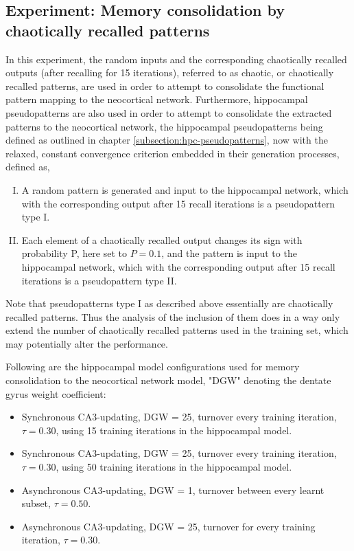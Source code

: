 \subsection{Experiment: Memory consolidation by chaotically recalled patterns}\label{subsect:rand-in-chaotic-out}

In this experiment, the random inputs and the corresponding chaotically recalled outputs (after recalling for 15 iterations), referred to as chaotic, or chaotically recalled patterns, are used in order to attempt to consolidate the functional pattern mapping to the neocortical network. Furthermore, hippocampal pseudopatterns are also used in order to attempt to consolidate the extracted patterns to the neocortical network, the hippocampal pseudopatterns being defined as outlined in chapter \ref{subsection:hpc-pseudopatterns}, now with the relaxed, constant convergence criterion embedded in their generation processes, defined as,

\begin{enumerate}[I.]
    \item A random pattern is generated and input to the hippocampal network, which with the corresponding output after 15 recall iterations is a pseudopattern type I.
    \item Each element of a chaotically recalled output changes its sign with probability P, here set to $P=0.1$, and the pattern is input to the hippocampal network, which with the corresponding output after 15 recall iterations is a pseudopattern type II.
\end{enumerate}

Note that pseudopatterns type I as described above essentially are chaotically recalled patterns. Thus the analysis of the inclusion of them does in a way only extend the number of chaotically recalled patterns used in the training set, which may potentially alter the performance.

Following are the hippocampal model configurations used for memory consolidation to the neocortical network model, "DGW" denoting the dentate gyrus weight coefficient:

\begin{itemize}
    \item Synchronous CA3-updating, DGW = 25, turnover every training iteration, $\tau=0.30$, using 15 training iterations in the hippocampal model.
    \item Synchronous CA3-updating, DGW = 25, turnover every training iteration, $\tau=0.30$, using 50 training iterations in the hippocampal model.
    \item Asynchronous CA3-updating, DGW = 1, turnover between every learnt subset, $\tau=0.50$.
    \item Asynchronous CA3-updating, DGW = 25, turnover for every training iteration, $\tau=0.30$.
\end{itemize}

